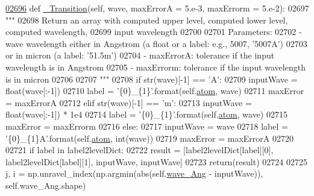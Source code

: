 \begin{DoxyCode}
\hypertarget{classpyneb_1_1core_1_1pynebcore_1_1_rec_atom_l02696}{}\hyperlink{classpyneb_1_1core_1_1pynebcore_1_1_rec_atom_a32b31a371f3b6ecc5bbbc4d0c5d2a855}{02696}     \textcolor{keyword}{def }\hyperlink{classpyneb_1_1core_1_1pynebcore_1_1_rec_atom_a32b31a371f3b6ecc5bbbc4d0c5d2a855}{\_Transition}(self, wave, maxErrorA = 5.e-3, maxErrorm = 5.e-2):
02697         \textcolor{stringliteral}{"""}
02698 \textcolor{stringliteral}{        Return an array with computed upper level, computed lower level, computed wavelength, }
02699 \textcolor{stringliteral}{            input wavelength}
02700 \textcolor{stringliteral}{        }
02701 \textcolor{stringliteral}{        Parameters:}
02702 \textcolor{stringliteral}{            - wave       wavelength either in Angstrom (a float or a label: e.g., 5007, '5007A') }
02703 \textcolor{stringliteral}{                            or in micron (a label: '51.5m')}
02704 \textcolor{stringliteral}{            - maxErrorA: tolerance if the input wavelength is in Angstrom}
02705 \textcolor{stringliteral}{            - maxErrorm: tolerance if the input wavelength is in micron}
02706 \textcolor{stringliteral}{                            }
02707 \textcolor{stringliteral}{        """}
02708         \textcolor{keywordflow}{if} str(wave)[-1] == \textcolor{stringliteral}{'A'}:
02709             inputWave = float(wave[:-1])
02710             label = \textcolor{stringliteral}{'\{0\}\_\{1\}'}.format(self.\hyperlink{classpyneb_1_1core_1_1pynebcore_1_1_rec_atom_a1a2aa175da6b5b8847f409e37437e3d3}{atom}, wave)
02711             maxError = maxErrorA
02712         \textcolor{keywordflow}{elif} str(wave)[-1] == \textcolor{stringliteral}{'m'}:
02713             inputWave = float(wave[:-1]) * 1e4
02714             label = \textcolor{stringliteral}{'\{0\}\_\{1\}'}.format(self.\hyperlink{classpyneb_1_1core_1_1pynebcore_1_1_rec_atom_a1a2aa175da6b5b8847f409e37437e3d3}{atom}, wave)
02715             maxError = maxErrorm
02716         \textcolor{keywordflow}{else}:
02717             inputWave = wave
02718             label = \textcolor{stringliteral}{'\{0\}\_\{1\}A'}.format(self.\hyperlink{classpyneb_1_1core_1_1pynebcore_1_1_rec_atom_a1a2aa175da6b5b8847f409e37437e3d3}{atom}, int(wave))
02719             maxError = maxErrorA
02720             
02721         \textcolor{keywordflow}{if} label \textcolor{keywordflow}{in} label2levelDict:
02722             result = [label2levelDict[label][0], label2levelDict[label][1], inputWave, inputWave]
02723             return(result)
02724         
02725         j, i = np.unravel\_index(np.argmin(abs(self.\hyperlink{classpyneb_1_1core_1_1pynebcore_1_1_rec_atom_aa2fd61021ea3067af77e7ee0053ace11}{wave\_Ang} - inputWave)), self.wave\_Ang.shape)

\end{DoxyCode}
